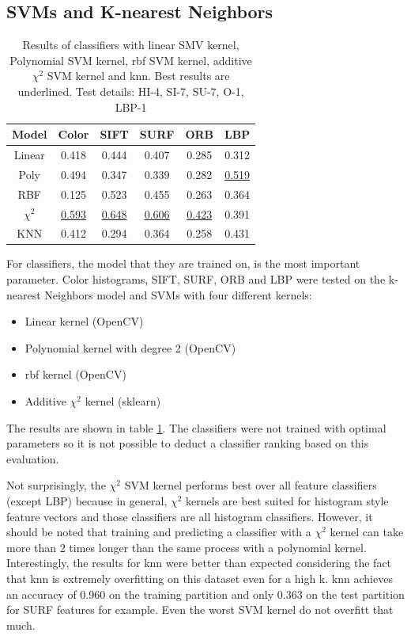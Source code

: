 	\subsection{SVMs and K-nearest Neighbors}
	\begin{table}[htb]
		\begin{tabular*}{\columnwidth}{@{\extracolsep{\stretch{1}}}*{6}{c}@{}}
			\toprule
			Model	 & Color & SIFT  & SURF  & ORB	 & LBP \\ \midrule
			Linear	 & 0.418 & 0.444 & 0.407 & 0.285 & 0.312\\
			Poly	 & 0.494 & 0.347 & 0.339 & 0.282 & \underline{0.519} \\
			RBF		 & 0.125 & 0.523 & 0.455 & 0.263 & 0.364\\
			$\chi^2$ & \underline{0.593} & \underline{0.648} & \underline{0.606} & \underline{0.423} & 0.391 \\
			KNN 	 & 0.412 & 0.294 & 0.364 & 0.258 & 0.431  \\ \bottomrule
		\end{tabular*}
		\caption{Results of classifiers with linear SMV kernel, Polynomial SVM kernel, \gls{rbf} SVM kernel, additive $\chi^2$ SVM kernel and \gls{knn}. Best results are underlined. Test details: HI-4, SI-7, SU-7, O-1, LBP-1}
		\label{tab:resultModels}
	\end{table}
	For classifiers, the model that they are trained on, is the most important parameter. Color histograms, SIFT, SURF, ORB and LBP were tested on the k-nearest Neighbors model and SVMs with four different kernels:
	\begin{itemize}
		\item Linear kernel {(OpenCV)}
		\item Polynomial kernel with degree 2 {(OpenCV)}
		\item \gls{rbf} kernel {(OpenCV)}
		\item Additive $\chi^2$ kernel {(sklearn)}
	\end{itemize} 
	The results are shown in table \ref{tab:resultModels}. The classifiers were not trained with optimal parameters so it is not possible to deduct a classifier ranking based on this evaluation.
	
	Not surprisingly, the $\chi^2$ SVM kernel performs best over all feature classifiers {(except LBP)} because in general, $\chi^2$ kernels are best suited for histogram style feature vectors and those classifiers are all histogram classifiers. However, it should be noted that training and predicting a classifier with a $\chi^2$ kernel can take more than 2 times longer than the same process with a polynomial kernel. Interestingly, the results for \gls{knn} were better than expected considering the fact that \gls{knn} is extremely overfitting on this dataset even for a high k. \gls{knn} achieves an accuracy of 0.960 on the training partition and only 0.363 on the test partition for SURF features for example. Even the worst SVM kernel do not overfitt that much.
	
